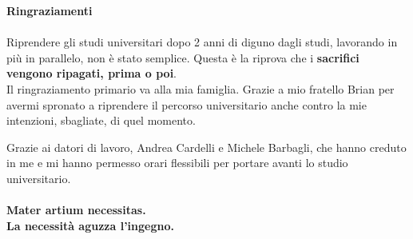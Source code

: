 \textbf{Ringraziamenti}
\paragraph{}
Riprendere gli studi universitari dopo 2 anni di diguno dagli studi, lavorando in più in parallelo, non è stato semplice.
Questa è la riprova che i \textbf{sacrifici vengono ripagati, prima o poi}.\\

Il ringraziamento primario va alla mia famiglia.
Grazie a mio fratello Brian per avermi spronato a riprendere il
percorso universitario anche contro la mie intenzioni,
sbagliate, di quel momento.

Grazie ai datori di lavoro, Andrea Cardelli e Michele Barbagli, 
che hanno creduto in me e mi hanno permesso orari flessibili
per portare avanti lo studio universitario.
\paragraph{}
\paragraph{}

\begin{center}
    \textbf{Mater artium necessitas.}\\
    \textbf{La necessità aguzza l'ingegno.}
\end{center}